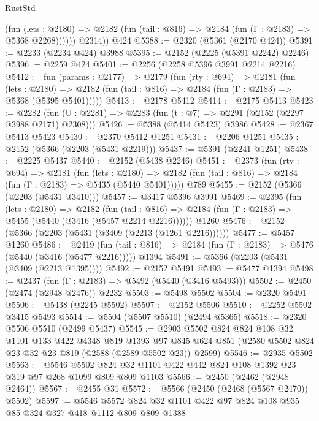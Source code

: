 \begin{lexlean}{RustStd}
\begin{coremodule}
              (fun (lets : @2180) =>
              @2182 (fun (tail : @816) => @2184 (fun (Γ : @2183) => @5368 @2268))))))
        @2314))
    @424
@5388 := @2320 (@5361 (@2170 @424))
@5391 := @2233 (@2234 @424) @3988
@5395 := @2152 (@2225 (@5391 @2242) @2246)
@5396 := @2259 @424
@5401 := @2256 (@2258 @5396 @3991 @2214 @2216)
@5412 := fun (params : @2177) =>
  @2179
    (fun (rty : @694) =>
    @2181
      (fun (lets : @2180) =>
      @2182 (fun (tail : @816) => @2184 (fun (Γ : @2183) => @5368 (@5395 @5401)))))
@5413 := @2178 @5412
@5414 := @2175 @5413
@5423 := @2282 (fun (U : @2281) => @2283 (fun (t : @7) => @2291 (@2152 (@2297 @3988 @2171) @2308)))
@5426 := @5388 (@5414 @5423) @3986
@5428 := @2367 @5413 @5423
@5430 := @2370 @5412 @1251
@5431 := @2206 @1251
@5435 := @2152 (@5366 (@2203 (@5431 @2219)))
@5437 := @5391 (@2241 @1251)
@5438 := @2225 @5437
@5440 := @2152 (@5438 @2246)
@5451 := @2373
    (fun (rty : @694) =>
    @2181
      (fun (lets : @2180) =>
      @2182 (fun (tail : @816) => @2184 (fun (Γ : @2183) => @5435 (@5440 @5401)))))
    @789
@5455 := @2152 (@5366 (@2203 (@5431 @3410)))
@5457 := @3417 @5396 @3991
@5469 := @2395
    (fun (lets : @2180) =>
    @2182
      (fun (tail : @816) => @2184 (fun (Γ : @2183) => @5455 (@5440 (@3416 (@5457 @2214 @2216))))))
    @1260
@5476 := @2152 (@5366 (@2203 (@5431 (@3409 (@2213 (@1261 @2216))))))
@5477 := @5457 @1260
@5486 := @2419
    (fun (tail : @816) => @2184 (fun (Γ : @2183) => @5476 (@5440 (@3416 (@5477 @2216)))))
    @1394
@5491 := @5366 (@2203 (@5431 (@3409 (@2213 @1395))))
@5492 := @2152 @5491
@5493 := @5477 @1394
@5498 := @2437 (fun (Γ : @2183) => @5492 (@5440 (@3416 @5493)))
@5502 := @2450 (@2474 (@2948 @2476)) @2232
@5503 := @5498 @5502
@5504 := @2320 @5491
@5506 := @5438 (@2245 @5502)
@5507 := @2152 @5506
@5510 := @2252 @5502 @3415 @5493
@5514 := @5504 (@5507 @5510) (@2494 @5365)
@5518 := @2320 @5506 @5510 (@2499 @5437)
@5545 := @2903
    @5502
    @824
    @824
    @108
    @32
    @1101
    @133
    @422
    @4348
    @819
    @1393
    @97
    @845
    @624
    @851
    (@2580 @5502 @824 @23 @32 @23 @819 (@2588 (@2589 @5502 @23)) @2599)
@5546 := @2935 @5502
@5563 := @5546
    @5502
    @824
    @32
    @1101
    @422
    @442
    @824
    @108
    @1392
    @23
    @319
    @97
    @268
    @1099
    @809
    @809
    @1103
@5566 := @2450 (@2462 (@2948 @2464))
@5567 := @2455 @31
@5572 := @5566 (@2450 (@2468 (@5567 @2470)) @5502)
@5597 := @5546
    @5572
    @824
    @32
    @1101
    @422
    @97
    @824
    @108
    @935
    @85
    @324
    @327
    @418
    @1112
    @809
    @809
    @1388

\end{coremodule}
\end{lexlean}
